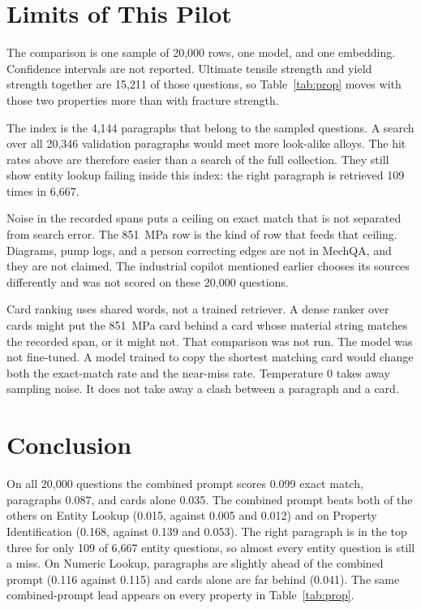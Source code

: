 \documentclass[conference]{IEEEtran}
\begin{document}
\section{Limits of This Pilot}
The comparison is one sample of 20{,}000 rows, one model, and one embedding. Confidence intervals are not reported. Ultimate tensile strength and yield strength together are 15{,}211 of those questions, so Table~\ref{tab:prop} moves with those two properties more than with fracture strength.

The index is the 4{,}144 paragraphs that belong to the sampled questions. A search over all 20{,}346 validation paragraphs would meet more look-alike alloys. The hit rates above are therefore easier than a search of the full collection. They still show entity lookup failing inside this index: the right paragraph is retrieved 109 times in 6{,}667.

Noise in the recorded spans puts a ceiling on exact match that is not separated from search error. The 851~MPa row is the kind of row that feeds that ceiling. Diagrams, pump logs, and a person correcting edges are not in MechQA, and they are not claimed. The industrial copilot mentioned earlier chooses its sources differently and was not scored on these 20{,}000 questions.

Card ranking uses shared words, not a trained retriever. A dense ranker over cards might put the 851~MPa card behind a card whose material string matches the recorded span, or it might not. That comparison was not run. The model was not fine-tuned. A model trained to copy the shortest matching card would change both the exact-match rate and the near-miss rate. Temperature 0 takes away sampling noise. It does not take away a clash between a paragraph and a card.

\section{Conclusion}
On all 20{,}000 questions the combined prompt scores 0.099 exact match, paragraphs 0.087, and cards alone 0.035. The combined prompt beats both of the others on Entity Lookup (0.015, against 0.005 and 0.012) and on Property Identification (0.168, against 0.139 and 0.053). The right paragraph is in the top three for only 109 of 6{,}667 entity questions, so almost every entity question is still a miss. On Numeric Lookup, paragraphs are slightly ahead of the combined prompt (0.116 against 0.115) and cards alone are far behind (0.041). The same combined-prompt lead appears on every property in Table~\ref{tab:prop}.
\end{document}
